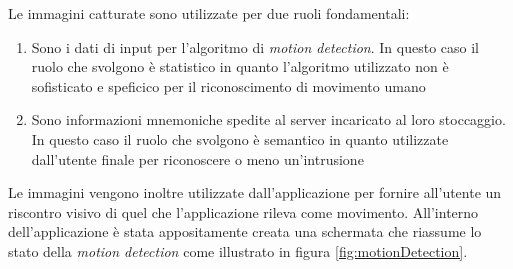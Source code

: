 \noindent Le immagini catturate sono utilizzate per due ruoli fondamentali:
\begin{enumerate}
  \item Sono i dati di input per l'algoritmo di \textit{motion detection}. In questo caso il ruolo che svolgono è statistico in quanto l'algoritmo utilizzato non è sofisticato e speficico per il riconoscimento di movimento umano
  \item Sono informazioni mnemoniche spedite al server incaricato al loro stoccaggio. In questo caso il ruolo che svolgono è semantico in quanto utilizzate dall'utente finale per riconoscere o meno un'intrusione
\end{enumerate}
\noindent Le immagini vengono inoltre utilizzate dall'applicazione per fornire all'utente un riscontro visivo di quel che l'applicazione rileva come movimento. All'interno dell'applicazione è stata appositamente creata una schermata che riassume lo stato della \textit{motion detection} come illustrato in figura \ref{fig:motionDetection}.
